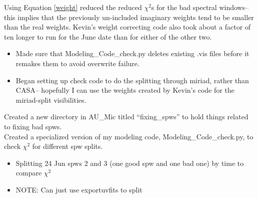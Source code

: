 \documentclass[a4paper]{tufte-handout}
\begin{document}
Using Equation \ref{weight} reduced the reduced $\chi^2$s for the bad spectral windows--this implies that the previously un-included imaginary weights tend to be smaller than the real weights. Kevin's weight correcting code also took about a factor of ten longer to run for the June date than for either of the other two.

\hrulefill

\begin{itemize}
  \item Made sure that Modeling\_Code\_check.py deletes existing .vis files before it remakes them to avoid overwrite failure.
  \item Began setting up check code to do the splitting through miriad, rather than CASA-- hopefully I can use the weights created by Kevin's code for the miriad-split visibilities.
\end{itemize}


\hrulefill

Created a new directory in AU\_Mic titled ``fixing\_spws'' to hold things related to fixing bad spws.\\
\indent Created a specialized version of my modeling code, Modeling\_Code\_check.py, to check $\chi^2$ for different spw splits.

\begin{itemize}
  \item Splitting 24 Jun spws 2 and 3 (one good spw and one bad one) by time to compare $\chi^2$
  \item NOTE: Can just use exportuvfits to split
\end{itemize}


\hrulefill



\end{document}
